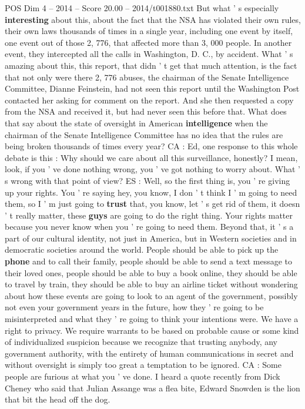 \begin{textsample}{POS Dim 4 – 2014 – Score 20.00 – 2014/t001880.txt}
But what ' s especially \textbf{interesting} about this, about the fact that the NSA has violated their own rules, their own laws thousands of times in a single year, including one event by itself, one event out of those 2, 776, that affected more than 3, 000 people.
In another event, they intercepted all the calls in Washington, D.
C., by accident.
What ' s amazing about this, this report, that didn ' t get that much attention, is the fact that not only were there 2, 776 abuses, the chairman of the Senate Intelligence Committee, Dianne Feinstein, had not seen this report until the Washington Post contacted her asking for comment on the report.
And she then requested a copy from the NSA and received it, but had never seen this before that.
What does that say about the state of oversight in American \textbf{intelligence} when the chairman of the Senate Intelligence Committee has no idea that the rules are being broken thousands of times every year?
CA : Ed, one response to this whole debate is this : Why should we care about all this surveillance, honestly?
I mean, look, if you ' ve done nothing wrong, you ' ve got nothing to worry about.
What ' s wrong with that point of view?
ES : Well, so the first thing is, you ' re giving up your rights.
You ' re saying hey, you know, I don ' t think I ' m going to need them, so I ' m just going to \textbf{trust} that, you know, let ' s get rid of them, it doesn ' t really matter, these \textbf{guys} are going to do the right thing.
Your rights matter because you never know when you ' re going to need them.
Beyond that, it ' s a part of our cultural identity, not just in America, but in Western societies and in democratic societies around the world.
People should be able to pick up the \textbf{phone} and to call their family, people should be able to send a text message to their loved ones, people should be able to buy a book online, they should be able to travel by train, they should be able to buy an airline ticket without wondering about how these events are going to look to an agent of the government, possibly not even your government years in the future, how they ' re going to be misinterpreted and what they ' re going to think your intentions were.
We have a right to privacy.
We require warrants to be based on probable cause or some kind of individualized suspicion because we recognize that trusting anybody, any government authority, with the entirety of human communications in secret and without oversight is simply too great a temptation to be ignored.
CA : Some people are furious at what you ' ve done.
I heard a quote recently from Dick Cheney who said that Julian Assange was a flea bite, Edward Snowden is the lion that bit the head off the dog.

\end{textsample}
